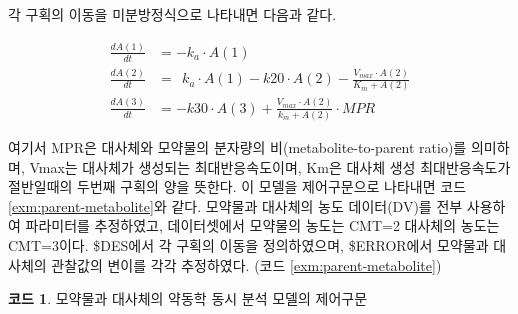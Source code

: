 \documentclass[
  11pt,
  krantz2,
  a4paper]{krantz}
\theoremstyle{definition}
\theoremstyle{definition}
\newtheorem{example}{코드}[chapter]
\theoremstyle{definition}
\theoremstyle{remark}
\begin{document}
각 구획의 이동을 미분방정식으로 나타내면 다음과 같다.

\begin{equation} 
\begin{split}
  \frac{dA(1)}{dt} & = -k_a \cdot A(1)  \\
  \frac{dA(2)}{dt} & = \ \ k_a \cdot A(1) - k20 \cdot A(2) - \frac{V_{max} \cdot A(2)}{K_m + A(2)} \\
  \frac{dA(3)}{dt} & = -k30 \cdot A(3) + \frac{V_{max} \cdot A(2)}{k_m + A(2)} \cdot MPR
\end{split}
\label{eq:comp-mpr}
\end{equation}

여기서 MPR은 대사체와 모약물의 분자량의 비(metabolite-to-parent ratio)를 의미하며, Vmax는 대사체가 생성되는 최대반응속도이며, Km은 대사체 생성 최대반응속도가 절반일때의 두번째 구획의 양을 뜻한다. 이 모델을 제어구문으로 나타내면 코드 \ref{exm:parent-metabolite}와 같다. 모약물과 대사체의 농도 데이터(DV)를 전부 사용하여 파라미터를 추정하였고, 데이터셋에서 모약물의 농도는 CMT=2 대사체의 농도는 CMT=3이다. \$DES에서 각 구획의 이동을 정의하였으며, \$ERROR에서 모약물과 대사체의 관찰값의 변이를 각각 추정하였다. (코드 \ref{exm:parent-metabolite})

\begin{example}
\protect\hypertarget{exm:parent-metabolite}{}{\label{exm:parent-metabolite} }모약물과 대사체의 약동학 동시 분석 모델의 제어구문
\end{example}
\end{document}
